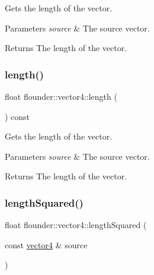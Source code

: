 Gets the length of the vector. 


\begin{DoxyParams}{Parameters}
{\em source} & The source vector. \\
\hline
\end{DoxyParams}
\begin{DoxyReturn}{Returns}
The length of the vector. 
\end{DoxyReturn}
\mbox{\label{classflounder_1_1vector4_ac0615801260a6a2b35eb5812c4834ac9}} 
\subsubsection{\texorpdfstring{length()}{length()}\hspace{0.1cm}{\footnotesize\ttfamily [2/2]}}
{\footnotesize\ttfamily float flounder\+::vector4\+::length (\begin{DoxyParamCaption}{ }\end{DoxyParamCaption}) const}



Gets the length of the vector. 


\begin{DoxyParams}{Parameters}
{\em source} & The source vector. \\
\hline
\end{DoxyParams}
\begin{DoxyReturn}{Returns}
The length of the vector. 
\end{DoxyReturn}
\mbox{\label{classflounder_1_1vector4_a39b1fe0dc549e692807b92b757c5fb95}} 
\subsubsection{\texorpdfstring{length\+Squared()}{lengthSquared()}\hspace{0.1cm}{\footnotesize\ttfamily [1/2]}}
{\footnotesize\ttfamily float flounder\+::vector4\+::length\+Squared (\begin{DoxyParamCaption}\item[{const \hyperlink{classflounder_1_1vector4}{vector4} \&}]{source }\end{DoxyParamCaption})\hspace{0.3cm}{\ttfamily [static]}}



